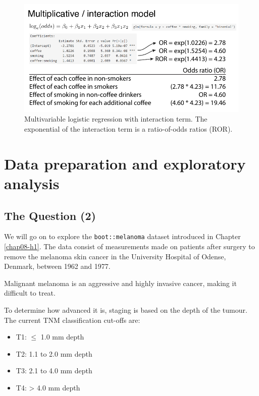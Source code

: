 \documentclass[
  12pt,
  krantz2]{krantz}
\providecommand{\tightlist}{%
  \setlength{\itemsep}{0pt}\setlength{\parskip}{0pt}}
\begin{document}
\begin{figure}
\centering
\includegraphics{images/chapter09/7_interactions.pdf}
\caption{\label{fig:chap09-fig-interaction}Multivariable logistic regression with interaction term. The exponential of the interaction term is a ratio-of-odds ratios (ROR).}
\end{figure}

\hypertarget{data-preparation-and-exploratory-analysis}{%
\section{Data preparation and exploratory analysis}\label{data-preparation-and-exploratory-analysis}}

\hypertarget{the-question-2-1}{%
\subsection{The Question (2)}\label{the-question-2-1}}

We will go on to explore the \texttt{boot::melanoma} dataset introduced in Chapter \ref{chap08-h1}.
The data consist of measurements made on patients after surgery to remove the melanoma skin cancer in the University Hospital of Odense, Denmark, between 1962 and 1977.

Malignant melanoma is an aggressive and highly invasive cancer, making it difficult to treat.

To determine how advanced it is, staging is based on the depth of the tumour.
The current TNM classification cut-offs are:

\begin{itemize}
\tightlist
\item
  T1: \(\leq\) 1.0 mm depth
\item
  T2: 1.1 to 2.0 mm depth
\item
  T3: 2.1 to 4.0 mm depth
\item
  T4: \textgreater{} 4.0 mm depth
\end{itemize}
\end{document}
